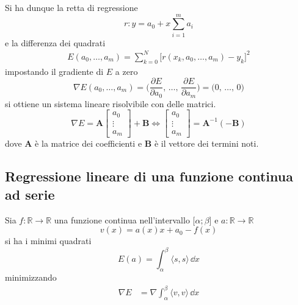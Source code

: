\noindent Si ha dunque la retta di regressione
\begin{equation}
    r: y = a_0 + x\sum_{i=1}^{m}a_i
\end{equation}
e la differenza dei quadrati
\begin{align}
    E(a_0, \dots, a_{m}) = \sum_{k=0}^{N}\Big[r(x_k, a_0, \dots, a_m)  - y_k\Big]^2
\end{align}
impostando il gradiente di \(E\) a zero
\begin{equation*}
    \nabla E(a_0, \dots, a_{m}) = \Big (
        \frac{\partial E}{\partial a_0},\,\dots,\,
        \frac{\partial E}{\partial a_m}
    \Big ) = \Big (0,\,\dots,\,0\Big)
\end{equation*}
si ottiene un sistema lineare risolvibile con delle matrici.
\[
    \nabla E = \mathbf{A}
        \begin{bmatrix} a_0 \\ \vdots \\ a_m \end{bmatrix} + \mathbf{B} \iff
    \begin{bmatrix} a_0 \\ \vdots \\ a_m \end{bmatrix} =
        \mathbf{A}^{-1}(-\mathbf{B})
\]
dove \(\mathbf{A}\) \`e la matrice dei coefficienti e \(\mathbf{B}\) \`e 
il vettore dei termini noti.

\subsection{Regressione lineare di una funzione continua ad serie}
Sia \(f: \mathbb{R}\to\mathbb{R}\) una funzione continua nell'intervallo
\(\mathopen [\alpha;\beta\mathclose]\) e \(a: \mathbb{R} \to\mathbb{R} \)
\[
    v(x) = a(x)x + a_0 - f(x)
\]
si ha i minimi quadrati
\[
    E(a) = \int_{\alpha}^{\beta} \langle s,s\rangle\,\dd{x}
\]
minimizzando
\begin{align*}
    \nabla E &= \nabla \int_\alpha^\beta \langle v,v\rangle\,\dd{x} 
\end{align*}



